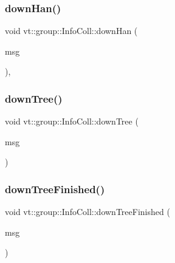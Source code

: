 \mbox{\label{structvt_1_1group_1_1_info_coll_a39c744a7ce406b9e14173aef499c6458}} 
\subsubsection{\texorpdfstring{down\+Han()}{downHan()}}
{\footnotesize\ttfamily void vt\+::group\+::\+Info\+Coll\+::down\+Han (\begin{DoxyParamCaption}\item[{\hyperlink{namespacevt_1_1group_a4c1183efe0185992fefb3ab38a55a8a7}{Group\+Collective\+Msg} $\ast$}]{msg }\end{DoxyParamCaption})\hspace{0.3cm}{\ttfamily [static]}, {\ttfamily [protected]}}

\mbox{\label{structvt_1_1group_1_1_info_coll_af0b3b5babeed07eab4d462a0adf5fe2b}} 
\subsubsection{\texorpdfstring{down\+Tree()}{downTree()}}
{\footnotesize\ttfamily void vt\+::group\+::\+Info\+Coll\+::down\+Tree (\begin{DoxyParamCaption}\item[{\hyperlink{namespacevt_1_1group_a4c1183efe0185992fefb3ab38a55a8a7}{Group\+Collective\+Msg} $\ast$}]{msg }\end{DoxyParamCaption})\hspace{0.3cm}{\ttfamily [private]}}

\mbox{\label{structvt_1_1group_1_1_info_coll_a0111e7d7705e380ed37ccd15d5fb434d}} 
\subsubsection{\texorpdfstring{down\+Tree\+Finished()}{downTreeFinished()}}
{\footnotesize\ttfamily void vt\+::group\+::\+Info\+Coll\+::down\+Tree\+Finished (\begin{DoxyParamCaption}\item[{\hyperlink{namespacevt_1_1group_a864fcf6bc821eacf8350bf4ad15e51b3}{Group\+Only\+Msg} $\ast$}]{msg }\end{DoxyParamCaption})\hspace{0.3cm}{\ttfamily [private]}}

